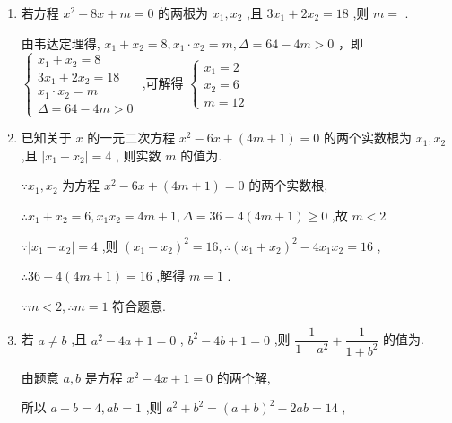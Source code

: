 \begin{enumerate}
    \item 若方程 ${x}^{2} - {8x} + m = 0$ 的两根为 ${x}_{1},{x}_{2}$ ,且 $3{x}_{1} + 2{x}_{2} = {18}$ ,则 $m =$ .
    \begin{jieda}
        由韦达定理得, ${x}_{1} + {x}_{2} = 8,{x}_{1} \cdot  {x}_{2} = m,\Delta  = {64} - {4m} > 0$ ，即 $\left\{  \begin{array}{l} {x}_{1} + {x}_{2} = 8 \\  3{x}_{1} + 2{x}_{2} = {18} \\  {x}_{1} \cdot  {x}_{2} = m \\  \Delta  = {64} - {4m} > 0 \end{array}\right.$ ,可解得 $\left\{  \begin{array}{l} {x}_{1} = 2 \\  {x}_{2} = 6 \\  m = {12} \end{array}\right.$
    \end{jieda}
    
    \item 已知关于 $x$ 的一元二次方程 ${x}^{2} - {6x} + \left( {{4m} + 1}\right)  = 0$ 的两个实数根为 ${x}_{1},{x}_{2}$ ,且 $\left| {{x}_{1} - {x}_{2}}\right|  = 4$ , 则实数 $m$ 的值为.
    \begin{jieda}
        $\because {x}_{1},{x}_{2}$ 为方程 ${x}^{2} - {6x} + \left( {{4m} + 1}\right)  = 0$ 的两个实数根,

         $\therefore {x}_{1} + {x}_{2} = 6,{x}_{1}{x}_{2} = {4m} + 1,\Delta  = {36} - 4\left( {{4m} + 1}\right)  \geq  0$ ,故 $m < 2$
        
        $\because \left| {{x}_{1} - {x}_{2}}\right|  = 4$ ,则 ${\left( {x}_{1} - {x}_{2}\right) }^{2} = {16},\therefore {\left( {x}_{1} + {x}_{2}\right) }^{2} - 4{x}_{1}{x}_{2} = {16}$ ,
        
         $\therefore {36} - 4\left( {{4m} + 1}\right)  = {16}$ ,解得 $m = 1$ .
        
        $\because m < 2,\therefore m = 1$ 符合题意.
    \end{jieda}
    
    \item 若 $a \neq  b$ ,且 ${a}^{2} - {4a} + 1 = 0$ , ${b}^{2} - {4b} + 1 = 0$ ,则 $\dfrac{1}{1 + {a}^{2}} + \dfrac{1}{1 + {b}^{2}}$ 的值为.
    \begin{jieda}
        由题意 $a,b$ 是方程 ${x}^{2} - {4x} + 1 = 0$ 的两个解,
        
        所以 $a + b = 4,{ab} = 1$ ,则 ${a}^{2} + {b}^{2} = {\left( a + b\right) }^{2} - {2ab} = {14}$ ,
        

\end{jieda}
\end{enumerate}
